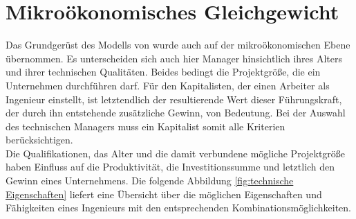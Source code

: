 \section[Mikroökonomisches Gleichgewicht]{Mikroökonomisches Gleichgewicht}\label{sec:mikro GG}
Das Grundgerüst des Modells von \cite{Acemoglu.2006} wurde auch auf der mikroökonomischen Ebene übernommen. Es unterscheiden sich auch hier Manager hinsichtlich ihres Alters und ihrer technischen Qualitäten. Beides bedingt die Projektgröße, die ein Unternehmen durchführen darf. Für den Kapitalisten, der einen Arbeiter als Ingenieur  einstellt, ist letztendlich der resultierende Wert dieser Führungskraft, der durch ihn entstehende zusätzliche Gewinn, von Bedeutung. Bei der Auswahl des technischen Managers muss ein Kapitalist somit alle Kriterien berücksichtigen.\\
%
Die Qualifikationen, das Alter und die damit verbundene mögliche Projektgröße haben Einfluss auf die Produktivität, die Investitionssumme und letztlich den Gewinn eines Unternehmens. Die folgende Abbildung \ref{fig:technische Eigenschaften} liefert eine Übersicht über die möglichen Eigenschaften und Fähigkeiten eines Ingenieurs mit den entsprechenden Kombinationsmöglichkeiten.\\
%
